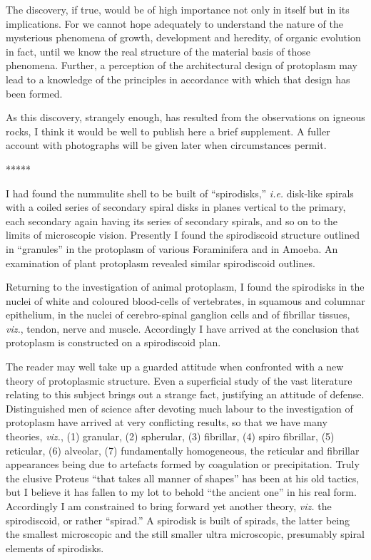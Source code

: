 \documentclass[a4paper, 12pt, oneside]{article}
\begin{document}
The discovery, if true, would be of high importance not only in itself but in its implications. For we cannot hope adequately to understand the nature of the mysterious phenomena of growth, development and heredity, of organic evolution in fact, until we know the real structure of the material basis of those phenomena. Further, a perception of the architectural design of protoplasm may lead to a knowledge of the principles in accordance with which that design has been formed.

As this discovery, strangely enough, has resulted from the observations on igneous rocks, I think it would be well to publish here a brief supplement. A fuller account with photographs will be given later when circumstances permit.

\centerline{*\hspace{15mm}*\hspace{15mm}*\hspace{15mm}*\hspace{15mm}*}
\bigskip

I had found the nummulite shell to be built of ``spirodisks,'' \emph{i.e.} disk-like spirals with a coiled series of secondary spiral disks in planes vertical to the primary, each secondary again having its series of secondary spirals, and so on to the limits of microscopic vision. Presently I found the spirodiscoid structure outlined in ``granules'' in the protoplasm of various Foraminifera and in Amoeba. An examination of plant protoplasm revealed similar spirodiscoid outlines.

Returning to the investigation of animal protoplasm, I found the spirodisks in the nuclei of white and coloured blood-cells of vertebrates, in squamous and columnar epithelium, in the nuclei of cerebro-spinal ganglion cells and of fibrillar tissues, \emph{viz.}, tendon, nerve and muscle. Accordingly I have arrived at the conclusion that protoplasm is constructed on a spirodiscoid plan.

The reader may well take up a guarded attitude when confronted with a new theory of protoplasmic structure. Even a superficial study of the vast literature relating to this subject brings out a strange fact, justifying an attitude of defense. Distinguished men of science after devoting much labour to the investigation of protoplasm have arrived at very conflicting results, so that we have many theories, \emph{viz.}, (1) granular, (2) spherular, (3) fibrillar, (4) spiro fibrillar, (5) reticular, (6) alveolar, (7) fundamentally homogeneous, the reticular and fibrillar appearances being due to artefacts formed by coagulation or precipitation. Truly the elusive Proteus ``that takes all manner of shapes'' has been at his old tactics, but I believe it has fallen to my lot to behold ``the ancient one'' in his real form. Accordingly I am constrained to bring forward yet another theory, \emph{viz.} the spirodiscoid, or rather ``spirad.'' A spirodisk is built of spirads, the latter being the smallest microscopic and the still smaller ultra microscopic, presumably spiral elements of spirodisks.
\end{document}
